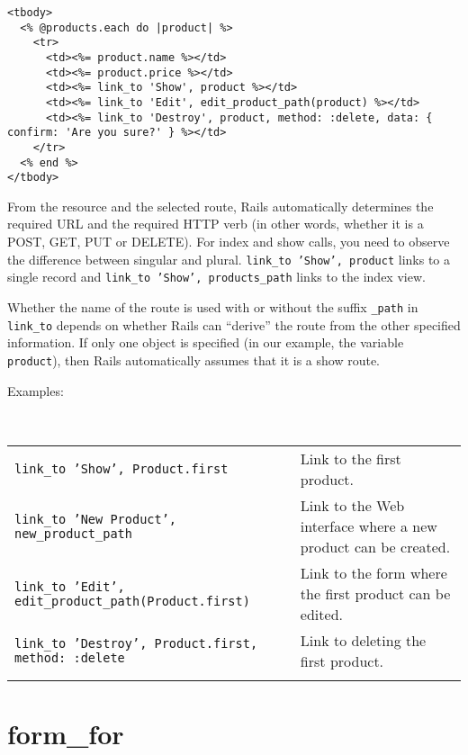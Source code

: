 \documentclass[a4paper]{book}
\newcounter{tab}[chapter]
\begin{document}
\begin{shaded}\begin{verbatim}
<tbody>
  <% @products.each do |product| %>
    <tr>
      <td><%= product.name %></td>
      <td><%= product.price %></td>
      <td><%= link_to 'Show', product %></td>
      <td><%= link_to 'Edit', edit_product_path(product) %></td>
      <td><%= link_to 'Destroy', product, method: :delete, data: { confirm: 'Are you sure?' } %></td>
    </tr>
  <% end %>
</tbody>
\end{verbatim}\end{shaded}

From the resource and the selected route, Rails automatically determines the required URL and the required HTTP verb (in other words, whether it is a POST, GET, PUT or DELETE). For index and show calls, you need to observe the difference between singular and plural. \texttt{link\_to 'Show', product} links to a single record and \texttt{link\_to 'Show', products\_path} links to the index view.

Whether the name of the route is used with or without the suffix \texttt{\_path} in \texttt{link\_to} depends on whether Rails can “derive” the route from the other specified information. If only one object is specified (in our example, the variable \texttt{product}), then Rails automatically assumes that it is a show route.

Examples:

\begin{longtable}[c]{@{}lp{10cm}@{}}
\caption{~}\\
\toprule\addlinespace
\texttt{link\_to 'Show', Product.first} & Link to the first product.
\\\addlinespace
\texttt{link\_to 'New Product',                 new\_product\_path} & Link to the Web interface where a new product can be created.
\\\addlinespace
\texttt{link\_to 'Edit',                 edit\_product\_path(Product.first)} & Link to the form where the first product can be edited.
\\\addlinespace
\texttt{link\_to 'Destroy', Product.first, method:                 :delete} & Link to deleting the first product.
\\\addlinespace
\bottomrule
\end{longtable}

\section{form\_for}\label{formux5ffor}
\end{document}
